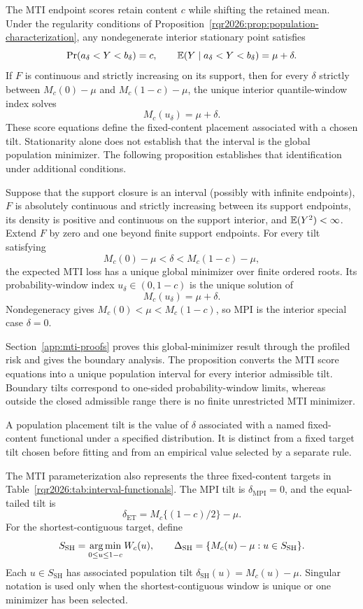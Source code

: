The MTI endpoint scores retain content \(c\) while shifting the retained mean.
Under the regularity conditions of
Proposition~\ref{rqr2026:prop:population-characterization}, any nondegenerate
interior stationary point satisfies
\[
\Pr(a_\delta<Y<b_\delta)=c,\qquad
\mathbb{E}(Y\mid a_\delta<Y<b_\delta)=\mu+\delta.
\]
If \(F\) is continuous and strictly increasing on its support, then for every
\(\delta\) strictly between \(M_c(0)-\mu\) and
\(M_c(1-c)-\mu\), the unique interior quantile-window index solves
\[
M_c(u_\delta)=\mu+\delta.
\]
These score equations define the fixed-content placement associated with a
chosen tilt. Stationarity alone does not establish that the interval is the
global population minimizer. The following proposition establishes that
identification under additional conditions.

\begin{proposition}
\label{rqr2026:thm:profiled-mean-tilt}
Suppose that the support closure is an interval (possibly with infinite
endpoints), \(F\) is absolutely continuous and strictly increasing between its
support endpoints, its density is positive and continuous on the support
interior, and \(\mathbb{E}(Y^2)<\infty\). Extend \(F\) by zero and one beyond finite
support endpoints. For every tilt satisfying
\[
M_c(0)-\mu<\delta<M_c(1-c)-\mu,
\]
the expected MTI loss has a unique global minimizer over finite ordered
roots. Its probability-window index \(u_\delta\in(0,1-c)\) is the unique
solution of
\[
M_c(u_\delta)=\mu+\delta.
\]
Nondegeneracy gives \(M_c(0)<\mu<M_c(1-c)\), so MPI is the interior
special case \(\delta=0\).
\end{proposition}

Section~\ref{app:mti-proofs} proves this global-minimizer result through the
profiled risk and gives the boundary analysis. The proposition converts the MTI
score equations into a unique population interval for every interior admissible
tilt. Boundary tilts correspond to
one-sided probability-window limits, whereas outside the closed admissible range there
is no finite unrestricted MTI minimizer.

A population placement tilt is the value of \(\delta\) associated with a named
fixed-content functional under a specified distribution. It is distinct from
a fixed target tilt chosen before fitting and from an empirical value selected
by a separate rule.

The MTI parameterization also represents the three fixed-content targets in
Table~\ref{rqr2026:tab:interval-functionals}. The MPI tilt is
\(\delta_{\mathrm{MPI}}=0\), and the equal-tailed tilt is
\[
\delta_{\mathrm{ET}}=M_c\{(1-c)/2\}-\mu.
\]
For the shortest-contiguous target, define
\[
S_{\mathrm{SH}}
=
\operatorname*{arg\,min}_{0\le u\le1-c}W_c(u),\qquad
\Delta_{\mathrm{SH}}
=
\{M_c(u)-\mu:u\in S_{\mathrm{SH}}\}.
\]
Each \(u\in S_{\mathrm{SH}}\) has associated population tilt
\(\delta_{\mathrm{SH}}(u)=M_c(u)-\mu\). Singular notation is used only when the
shortest-contiguous window is unique or one minimizer has been selected.

